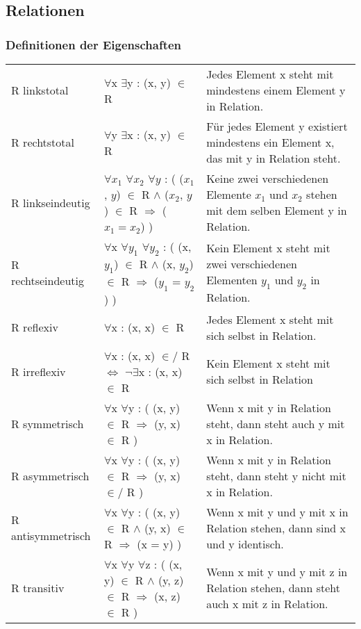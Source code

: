 \documentclass[6pt,a4paper]{scrartcl}
\begin{document}

\begin{multicols*}{2}

\subsection{Relationen}
\subsubsection{Definitionen der Eigenschaften}
\begin{tabular}{lll}
R linkstotal			& $\forall$x $\exists$y : (x, y) $\in$ R 																						& Jedes Element x steht mit mindestens einem Element y in Relation.								\\
R rechtstotal		& $\forall$y $\exists$x : (x, y) $\in$ R 																						& Für jedes Element y existiert mindestens ein Element x, das mit y in Relation steht.				\\
R linkseindeutig		& $\forall x_1$ $\forall x_2$ $\forall y$ : ( ($x_1$, $y$) $\in$ R $\land$ ($x_2$, $y$) $\in$ R $\Rightarrow$ ($x_1 = x_2$) )	& Keine zwei verschiedenen Elemente $x_1$ und $x_2$ stehen mit dem selben Element y in Relation.	\\
R rechtseindeutig	& $\forall$x $\forall y_1$ $\forall y_2$ : ( (x, $y_1$) $\in$ R $\land$ (x, $y_2$) $\in$ R $\Rightarrow$ ($y_1$ = $y_2$) )		& Kein Element x steht mit zwei verschiedenen Elementen $y_1$ und $y_2$ in Relation.				\\
R reflexiv			& $\forall$x : (x, x) $\in$ R 																								& Jedes Element x steht mit sich selbst in Relation.												\\	
R irreflexiv			& $\forall$x : (x, x) $\in$/ R $\Leftrightarrow$ $\lnot\exists$x : (x, x) $\in$ R 												& Kein Element x steht mit sich selbst in Relation												\\
R symmetrisch		& $\forall$x $\forall$y : ( (x, y) $\in$ R $\Rightarrow$ (y, x) $\in$ R )														& Wenn x mit y in Relation steht, dann steht auch y mit x in Relation.							\\
R asymmetrisch		& $\forall$x $\forall$y : ( (x, y) $\in$ R $\Rightarrow$ (y, x) $\in$/ R )													& Wenn x mit y in Relation steht, dann steht y nicht mit x in Relation.							\\
R antisymmetrisch	& $\forall$x $\forall$y : ( (x, y) $\in$ R $\land$ (y, x) $\in$ R $\Rightarrow$ (x = y) )										& Wenn x mit y und y mit x in Relation stehen, dann sind x und y identisch.						\\
R transitiv			& $\forall$x $\forall$y $\forall$z : ( (x, y) $\in$ R $\land$ (y, z) $\in$ R $\Rightarrow$ (x, z) $\in$ R )					& Wenn x mit y und y mit z in Relation stehen, dann steht auch x mit z in Relation.				\\
\end{tabular}


\end{multicols*}
\end{document}

